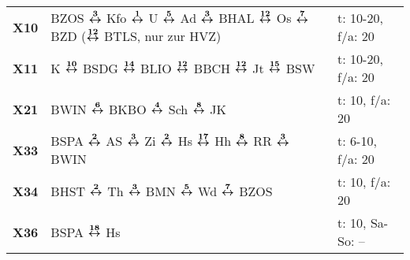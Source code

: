 \begin{minipage}[t]{0.45\textwidth}
\begin{tabular}{>{\bfseries}L{1.2cm}L{9.0cm}L{3.0cm}}
\xbus{} X10   & BZOS $\xarwe{3}$ Kfo $\xarwe{1}$ U $\xarwe{5}$ Ad $\xarwe{3}$ BHAL $\xarwe{12}$ Os $\xarwe{7}$ BZD ($\xarwe{12}$ BTLS, nur zur HVZ)                                 & t: 10-20, f/a: 20          \\
\xbus{} X11   & K $\xarwe{10}$ BSDG $\xarwe{14}$ BLIO $\xarwe{12}$ BBCH $\xarwe{12}$ Jt $\xarwe{15}$ BSW                                                                            & t: 10-20, f/a: 20          \\
\xbus{} X21   & BWIN $\xarwe{6}$ BKBO $\xarwe{4}$ Sch $\xarwe{8}$ JK                                                                                                                & t: 10, f/a: 20             \\
\xbus{} X33   & BSPA $\xarwe{2}$ AS $\xarwe{3}$ Zi $\xarwe{2}$ Hs $\xarwe{17}$ Hh $\xarwe{8}$ RR $\xarwe{3}$ BWIN                                                                   & t: 6-10, f/a: 20           \\
\xbus{} X34   & BHST $\xarwe{2}$ Th $\xarwe{3}$ BMN $\xarwe{5}$ Wd $\xarwe{7}$ BZOS                                                                                                 & t: 10, f/a: 20             \\
\xbus{} X36   & BSPA $\xarwe{18}$ Hs                                                                                                                                                & t: 10, Sa-So: --           \\
\hline
\end{tabular}
\end{minipage}
